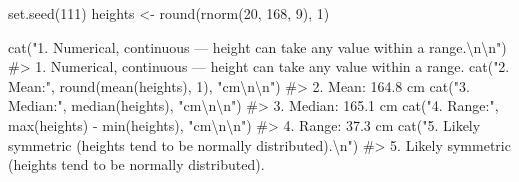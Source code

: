 \documentclass[
  11pt,
  a4paper,
  oneside,
  open=any]{scrbook}
\newenvironment{Shaded}{\begin{snugshade}}{\end{snugshade}}
\newcommand{\CommentTok}[1]{\textcolor[rgb]{0.37,0.37,0.37}{#1}}
\newcommand{\DecValTok}[1]{\textcolor[rgb]{0.68,0.00,0.00}{#1}}
\newcommand{\FunctionTok}[1]{\textcolor[rgb]{0.28,0.35,0.67}{#1}}
\newcommand{\NormalTok}[1]{\textcolor[rgb]{0.00,0.23,0.31}{#1}}
\newcommand{\OtherTok}[1]{\textcolor[rgb]{0.00,0.23,0.31}{#1}}
\newcommand{\SpecialCharTok}[1]{\textcolor[rgb]{0.37,0.37,0.37}{#1}}
\newcommand{\StringTok}[1]{\textcolor[rgb]{0.13,0.47,0.30}{#1}}
\begin{document}
\begin{tcolorbox}[enhanced jigsaw, breakable, leftrule=.75mm, bottomtitle=1mm, bottomrule=.15mm, titlerule=0mm, left=2mm, opacitybacktitle=0.6, coltitle=black, colbacktitle=quarto-callout-note-color!10!white, rightrule=.15mm, title=\textcolor{quarto-callout-note-color}{\faInfo}\hspace{0.5em}{Worked solutions}, toptitle=1mm, arc=.35mm, colback=white, toprule=.15mm, colframe=quarto-callout-note-color-frame, opacityback=0]

\begin{Shaded}
\begin{Highlighting}[]
\FunctionTok{set.seed}\NormalTok{(}\DecValTok{111}\NormalTok{)}
\NormalTok{heights }\OtherTok{\textless{}{-}} \FunctionTok{round}\NormalTok{(}\FunctionTok{rnorm}\NormalTok{(}\DecValTok{20}\NormalTok{, }\DecValTok{168}\NormalTok{, }\DecValTok{9}\NormalTok{), }\DecValTok{1}\NormalTok{)}

\FunctionTok{cat}\NormalTok{(}\StringTok{"1. Numerical, continuous — height can take any value within a range.}\SpecialCharTok{\textbackslash{}n\textbackslash{}n}\StringTok{"}\NormalTok{)}
\CommentTok{\#\textgreater{} 1. Numerical, continuous — height can take any value within a range.}
\FunctionTok{cat}\NormalTok{(}\StringTok{"2. Mean:"}\NormalTok{, }\FunctionTok{round}\NormalTok{(}\FunctionTok{mean}\NormalTok{(heights), }\DecValTok{1}\NormalTok{), }\StringTok{"cm}\SpecialCharTok{\textbackslash{}n\textbackslash{}n}\StringTok{"}\NormalTok{)}
\CommentTok{\#\textgreater{} 2. Mean: 164.8 cm}
\FunctionTok{cat}\NormalTok{(}\StringTok{"3. Median:"}\NormalTok{, }\FunctionTok{median}\NormalTok{(heights), }\StringTok{"cm}\SpecialCharTok{\textbackslash{}n\textbackslash{}n}\StringTok{"}\NormalTok{)}
\CommentTok{\#\textgreater{} 3. Median: 165.1 cm}
\FunctionTok{cat}\NormalTok{(}\StringTok{"4. Range:"}\NormalTok{, }\FunctionTok{max}\NormalTok{(heights) }\SpecialCharTok{{-}} \FunctionTok{min}\NormalTok{(heights), }\StringTok{"cm}\SpecialCharTok{\textbackslash{}n\textbackslash{}n}\StringTok{"}\NormalTok{)}
\CommentTok{\#\textgreater{} 4. Range: 37.3 cm}
\FunctionTok{cat}\NormalTok{(}\StringTok{"5. Likely symmetric (heights tend to be normally distributed).}\SpecialCharTok{\textbackslash{}n}\StringTok{"}\NormalTok{)}
\CommentTok{\#\textgreater{} 5. Likely symmetric (heights tend to be normally distributed).}
\end{Highlighting}
\end{Shaded}

\end{tcolorbox}
\end{document}
